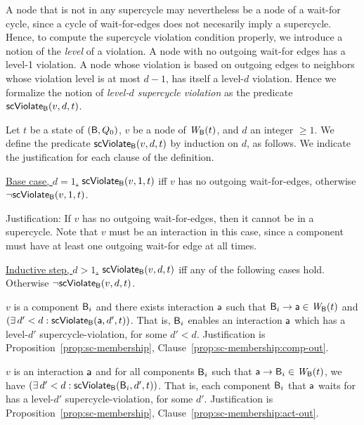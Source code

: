 A node that is not in any supercycle may nevertheless be a node of a wait-for cycle, since a cycle
of wait-for-edges does not necesarily imply a supercycle. Hence, to compute the supercycle violation
condition properly, we introduce a notion of the \emph{level} of a violation. A node with no
outgoing wait-for edges has a level-1 violation. A node whose violation is based on outgoing edges
to neighbors whose violation level is at most $d-1$, has itself a level-$d$ violation.  Hence we
formalize the notion of \emph{level-$d$ supercycle violation} as the predicate $\mathsf{scViolate}_{\mathsf{B}}(v,d,t)$.


\label{def:supercycle-violation}
\label{def:supercycle.violation}
Let $t$ be a state of $(\mathsf{B}, Q_0)$, $v$ be a node of $\mathit{W}_{\mathsf{B}}({t})$, and $d$ an integer $\ge 1$.
We define the predicate $\mathsf{scViolate}_{\mathsf{B}}(v,d,t)$ by induction on $d$, as follows. We indicate the
justification for each clause of the definition.

\noindent
\ul{Base case, $d=1$.} $\mathsf{scViolate}_{\mathsf{B}}(v,1,t)$ iff $v$ has no outgoing wait-for-edges, otherwise $\neg \mathsf{scViolate}_{\mathsf{B}}(v,1,t)$.

Justification: If $v$ has no outgoing wait-for-edges, then it cannot be in a supercycle.  Note that $v$ must be an
interaction in this case, since a component must have at least one outgoing wait-for edge at all times.

\noindent
\ul{Inductive step, $d > 1$.}  $\mathsf{scViolate}_{\mathsf{B}}(v,d,t)$ iff any of the following cases hold. Otherwise $\neg \mathsf{scViolate}_{\mathsf{B}}(v,d,t)$.

\bn

\item  \label{def:supercycle.violation.component.out}
$v$ is a component $\mathsf{B}_i$ and there exists interaction $\mathsf{a}$ such that $\mathsf{B}_i \rightarrow \mathsf{a} \in \mathit{W}_{\mathsf{B}}({t})$ and $(\exists\, d' < d: \mathsf{scViolate}_{\mathsf{B}}(\mathsf{a},d',t))$.
That is, $\mathsf{B}_i$ enables an interaction $\mathsf{a}$ which has a level-$d'$ supercycle-violation, for some $d' < d$.
Justification is Proposition~\ref{prop:sc-membership}, Clause~\ref{prop:sc-membership:comp-out}.


\item \label{def:supercycle.violation.interaction.out}
$v$ is an interaction $\mathsf{a}$ and for all components $\mathsf{B}_i$ such that $\mathsf{a} \rightarrow \mathsf{B}_i \in \mathit{W}_{\mathsf{B}}({t})$, we have $(\exists\, d' < d: \mathsf{scViolate}_{\mathsf{B}}(\mathsf{B}_i,d',t))$.
That is, each component $\mathsf{B}_i$ that $\mathsf{a}$ waits for has a level-$d'$ supercycle-violation, for some $d'$.
Justification is Proposition~\ref{prop:sc-membership}, Clause~\ref{prop:sc-membership:act-out}.

